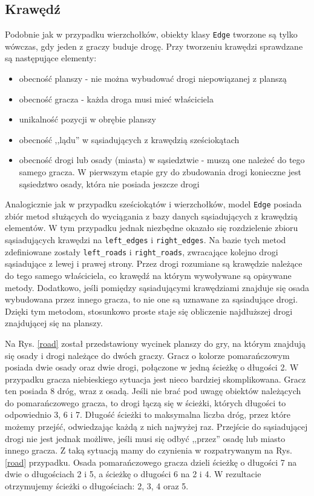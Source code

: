 \documentclass[11pt,twoside]{report}
\providecommand{\imref}[1]{Rys. \ref{#1}} %
\begin{document}
\subsection{Krawędź}

Podobnie jak w przypadku wierzchołków, obiekty klasy \texttt{Edge}
tworzone są tylko wówczas, gdy jeden z graczy buduje drogę. Przy
tworzeniu krawędzi sprawdzane są następujące elementy:

\begin{itemize}
\item obecność planszy - nie można wybudować drogi niepowiązanej z
  planszą
\item obecność gracza - każda droga musi mieć właściciela
\item unikalność pozycji w obrębie planszy
\item obecność ,,lądu'' w sąsiadujących z krawędzią sześciokątach
\item obecność drogi lub osady (miasta) w sąsiedztwie - muszą one
  należeć do tego samego gracza. W pierwszym etapie gry do zbudowania
  drogi konieczne jest sąsiedztwo osady, która nie posiada jeszcze
  drogi
\end{itemize}

Analogicznie jak w przypadku sześciokątów i wierzchołków, model
\texttt{Edge} posiada zbiór metod służących do wyciągania z bazy
danych sąsiadujących z krawędzią elementów. W tym przypadku jednak
niezbędne okazało się rozdzielenie zbioru sąsiadujących krawędzi na
\texttt{left\_edges} i \texttt{right\_edges}. Na bazie tych metod
zdefiniowane zostały \texttt{left\_roads} i \texttt{right\_roads},
zwracające kolejno drogi sąsiadujące z lewej i prawej strony. Przez
drogi rozumiane są krawędzie należące do tego samego właściciela, co
krawędź na którym wywoływane są opisywane metody. Dodatkowo, jeśli
pomiędzy sąsiadującymi krawędziami znajduje się osada wybudowana przez
innego gracza, to nie one są uznawane za sąsiadujące drogi. Dzięki tym
metodom, stosunkowo proste staje się obliczenie najdłuższej drogi
znajdującej się na planszy.

Na \imref{road} został przedstawiony wycinek planszy do gry, na którym
znajdują się osady i drogi należące do dwóch graczy. Gracz o kolorze
pomarańczowym posiada dwie osady oraz dwie drogi, połączone w jedną
ścieżkę o długości 2. W przypadku gracza niebieskiego sytuacja jest
nieco bardziej skomplikowana. Gracz ten posiada 8 dróg, wraz z
osadą. Jeśli nie brać pod uwagę obiektów należących do pomarańczowego
gracza, to drogi łączą się w ścieżki, których długości to odpowiednio
3, 6 i 7. Długość ścieżki to maksymalna liczba dróg, przez które
możemy przejść, odwiedzając każdą z nich najwyżej raz. Przejście do
sąsiadującej drogi nie jest jednak możliwe, jeśli musi się odbyć
,,przez'' osadę lub miasto innego gracza. Z taką sytuacją mamy do
czynienia w rozpatrywanym na \imref{road} przypadku. Osada
pomarańczowego gracza dzieli ścieżkę o długości 7 na dwie o
długościach 2 i 5, a ścieżkę o długości 6 na 2 i 4. W rezultacie
otrzymujemy ścieżki o długościach: 2, 3, 4 oraz 5.
\end{document}
